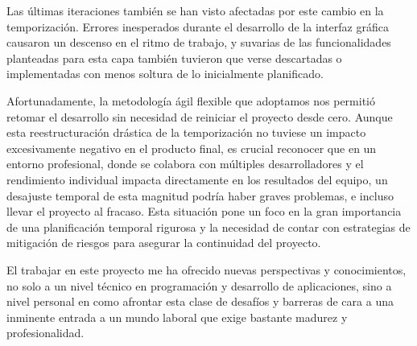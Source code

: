 Las últimas iteraciones también se han visto afectadas por este cambio en la temporización. Errores inesperados durante el desarrollo de la interfaz gráfica causaron un descenso en el ritmo de trabajo, y suvarias de las funcionalidades planteadas para esta capa también tuvieron que verse descartadas o implementadas con menos soltura de lo inicialmente planificado.

Afortunadamente, la metodología ágil flexible que adoptamos nos permitió retomar el desarrollo sin necesidad de reiniciar el proyecto desde cero. Aunque esta reestructuración drástica de la temporización no tuviese un impacto excesivamente negativo en el producto final, es crucial reconocer que en un entorno profesional, donde se colabora con múltiples desarrolladores y el rendimiento individual impacta directamente en los resultados del equipo, un desajuste temporal de esta magnitud podría haber graves problemas, e incluso llevar el proyecto al fracaso. Esta situación pone un foco en la gran importancia de una planificación temporal rigurosa y la necesidad de contar con estrategias de mitigación de riesgos para asegurar la continuidad del proyecto.


El trabajar en este proyecto me ha ofrecido nuevas perspectivas y conocimientos, no solo a un nivel técnico en programación y desarrollo de aplicaciones, sino a nivel personal en como afrontar esta clase de desafíos y barreras de cara a una inminente entrada a un mundo laboral que exige bastante madurez y profesionalidad.